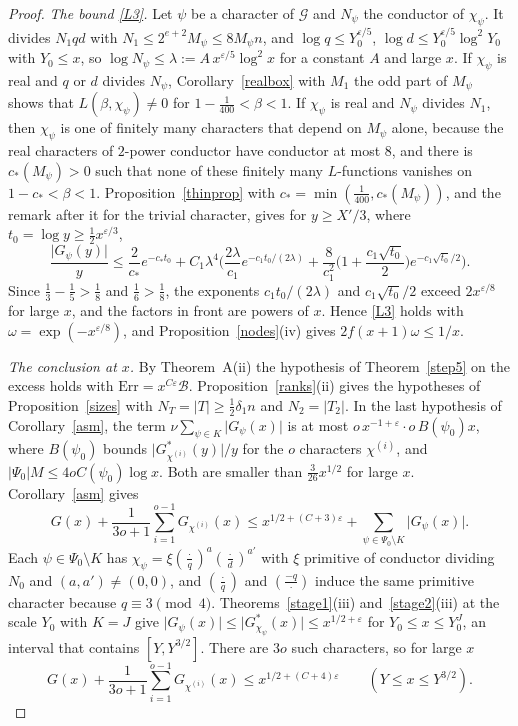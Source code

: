 \begin{proof}
\emph{The bound \eqref{L3}.} Let $\psi$ be a character of $\mathcal G$ and $N_\psi$ the conductor of $\chi_\psi$. It divides $N_1qd$ with $N_1\le2^{e+2}M_\psi\le8M_\psi n$, and $\log q\le Y_0^{\varepsilon/5}$, $\log d\le Y_0^{\varepsilon/5}\log^2Y_0$ with $Y_0\le x$, so $\log N_\psi\le\lambda:=A\,x^{\varepsilon/5}\log^2x$ for a constant $A$ and large $x$. If $\chi_\psi$ is real and $q$ or $d$ divides $N_\psi$, Corollary~\ref{realbox} with $M_1$ the odd part of $M_\psi$ shows that $L(\beta,\chi_\psi)\ne0$ for $1-\frac1{400}<\beta<1$. If $\chi_\psi$ is real and $N_\psi$ divides $N_1$, then $\chi_\psi$ is one of finitely many characters that depend on $M_\psi$ alone, because the real characters of $2$-power conductor have conductor at most $8$, and there is $c_\ast(M_\psi)>0$ such that none of these finitely many $L$-functions vanishes on $1-c_\ast<\beta<1$. Proposition~\ref{thinprop} with $c_\ast=\min(\frac1{400},c_\ast(M_\psi))$, and the remark after it for the trivial character, gives for $y\ge X'/3$, where $t_0=\log y\ge\frac12x^{\varepsilon/3}$,
\[
\frac{\lvert G_\psi(y)\rvert}{y}\le\frac2{c_\ast}e^{-c_\ast t_0}+C_1\lambda^4\Big(\frac{2\lambda}{c_1}e^{-c_1t_0/(2\lambda)}+\frac8{c_1^2}\Big(1+\frac{c_1\sqrt{t_0}}2\Big)e^{-c_1\sqrt{t_0}/2}\Big).
\]
Since $\frac13-\frac15>\frac18$ and $\frac16>\frac18$, the exponents $c_1t_0/(2\lambda)$ and $c_1\sqrt{t_0}/2$ exceed $2x^{\varepsilon/8}$ for large $x$, and the factors in front are powers of $x$. Hence \eqref{L3} holds with $\omega=\exp(-x^{\varepsilon/8})$, and Proposition~\ref{nodes}(iv) gives $2f(x+1)\omega\le1/x$.

\emph{The conclusion at $x$.} By Theorem~A(ii) the hypothesis of Theorem~\ref{step5} on the excess holds with $\mathrm{Err}=x^{C\varepsilon}\mathcal B$. Proposition~\ref{ranks}(ii) gives the hypotheses of Proposition~\ref{sizes} with $N_T=\lvert T\rvert\ge\frac12\delta_1n$ and $N_2=\lvert T_2\rvert$. In the last hypothesis of Corollary~\ref{asm}, the term $\nu\sum_{\psi\in K}\lvert G_\psi(x)\rvert$ is at most $o\,x^{-1+\varepsilon}\cdot o\,B(\psi_0)x$, where $B(\psi_0)$ bounds $\lvert G^\ast_{\chi^{(i)}}(y)\rvert/y$ for the $o$ characters $\chi^{(i)}$, and $\lvert\Psi_0\rvert M\le4oC(\psi_0)\log x$. Both are smaller than $\frac3{26}x^{1/2}$ for large $x$. Corollary~\ref{asm} gives
\[
G(x)+\frac1{3o+1}\sum_{i=1}^{o-1}G_{\chi^{(i)}}(x)\le x^{1/2+(C+3)\varepsilon}+\sum_{\psi\in\Psi_0\setminus K}\lvert G_\psi(x)\rvert .
\]
Each $\psi\in\Psi_0\setminus K$ has $\chi_\psi=\xi(\frac{\cdot}{q})^a(\frac{\cdot}{d})^{a'}$ with $\xi$ primitive of conductor dividing $N_0$ and $(a,a')\ne(0,0)$, and $(\frac{\cdot}{q})$ and $(\frac{-q}{\cdot})$ induce the same primitive character because $q\equiv3\pmod4$. Theorems~\ref{stage1}(iii) and~\ref{stage2}(iii) at the scale $Y_0$ with $K=J$ give $\lvert G_\psi(x)\rvert\le\lvert G^\ast_{\chi_\psi}(x)\rvert\le x^{1/2+\varepsilon}$ for $Y_0\le x\le Y_0^J$, an interval that contains $[Y,Y^{3/2}]$. There are $3o$ such characters, so for large $x$
\begin{equation}\label{finalbound}
G(x)+\frac1{3o+1}\sum_{i=1}^{o-1}G_{\chi^{(i)}}(x)\le x^{1/2+(C+4)\varepsilon}\qquad(Y\le x\le Y^{3/2}).
\end{equation}


\end{proof}
